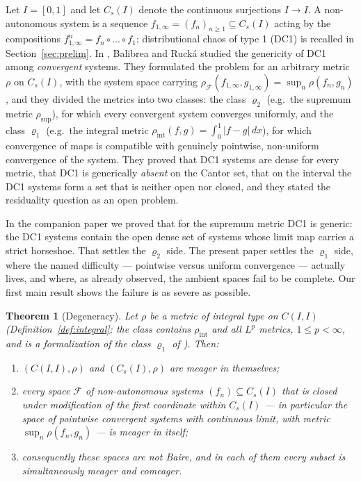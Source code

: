 ﻿\documentclass[11pt]{article}
\newtheorem{theorem}{Theorem}[section]
\newcommand{\I}{I}
\newcommand{\Cs}{C_s(\I)}
\newcommand{\CI}{C(\I,\I)}
\newcommand{\rint}{\rho_{\mathrm{int}}}
\newcommand{\rsup}{\rho_{\sup}}
\begin{document}
Let $\I=[0,1]$ and let $\Cs$ denote the continuous surjections $\I\to\I$.  A
non-autonomous system is a sequence $f_{1,\infty}=(f_n)_{n\ge1}\subseteq\Cs$ acting
by the compositions $f^n_{1,\infty}=f_n\circ\dots\circ f_1$; distributional chaos of
type 1 (DC1) is recalled in Section~\ref{sec:prelim}.  In \cite{BR}, Balibrea and
Ruck\'a studied the genericity of DC1 among \emph{convergent} systems.  They
formulated the problem for an arbitrary metric $\rho$ on $\Cs$, with the system
space carrying $\rho_{\mathcal F}(f_{1,\infty},g_{1,\infty})=\sup_n\rho(f_n,g_n)$,
and they divided the metrics into two classes: the class $\varrho_2$ (e.g.\ the
supremum metric $\rsup$), for which every convergent system converges uniformly,
and the class $\varrho_1$ (e.g.\ the integral metric
$\rint(f,g)=\int_0^1|f-g|\,dx$), for which convergence of maps is compatible with
genuinely pointwise, non-uniform convergence of the system.  They proved that DC1
systems are dense for every metric, that DC1 is generically \emph{absent} on the
Cantor set, that on the interval the DC1 systems form a set that is neither open
nor closed, and they stated the residuality question as an open problem.

In the companion paper \cite{companion} we proved that for the supremum metric DC1
is generic: the DC1 systems contain the open dense set of systems whose limit map
carries a strict horseshoe.  That settles the $\varrho_2$ side.  The present paper
settles the $\varrho_1$ side, where the named difficulty --- pointwise versus
uniform convergence --- actually lives, and where, as \cite{BR} already observed,
the ambient spaces fail to be complete.  Our first main result shows the failure is
as severe as possible.

\begin{theorem}[Degeneracy]\label{thm:meager}
Let $\rho$ be a metric of integral type on $\CI$ (Definition~\ref{def:integral};
the class contains $\rint$ and all $L^p$ metrics, $1\le p<\infty$, and is a
formalization of the class $\varrho_1$ of \cite{BR}).  Then:
\begin{enumerate}
\item[(i)] $(\CI,\rho)$ and $(\Cs,\rho)$ are meager in themselves;
\item[(ii)] every space $\mathcal F$ of non-autonomous systems
$(f_n)\subseteq\Cs$ that is closed under modification of the first coordinate
within $\Cs$ --- in particular the space of pointwise convergent systems with
continuous limit, with metric $\sup_n\rho(f_n,g_n)$ --- is meager in itself;
\item[(iii)] consequently these spaces are not Baire, and in each of them
\emph{every} subset is simultaneously meager and comeager.
\end{enumerate}
\end{theorem}
\end{document}
